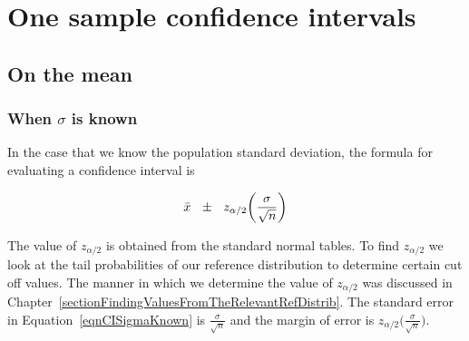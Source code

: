 \section{One sample confidence intervals}
\label{sectionOneSampleConfidenceIntervals}

\subsection{On the mean}

\subsubsection{When $\sigma$ is known}
\label{sectionCIWhenSigmaIsKnown}

In the case that we know the population standard deviation, the formula for evaluating a
confidence interval is 

\begin{termBox}{
\begin{equation}
\bar{x}	~~ \pm ~~		z_{\alpha / 2}  \bigg( \frac{\sigma}{ \sqrt{n} } \bigg)\label{eqnCISigmaKnown}\\
\end{equation}
}
\end{termBox}


The value of $z_{\alpha/2}$ is obtained from the standard normal tables.
To find $z_{\alpha/2}$ we look at the tail probabilities of our reference distribution to determine certain cut off values.
The manner in which we determine the value of $z_{\alpha / 2}$ was
discussed in Chapter~\ref{sectionFindingValuesFromTheRelevantRefDistrib}.
The standard error in Equation~\ref{eqnCISigmaKnown} is $\frac{\sigma}{\sqrt{n}}$
and the margin of error is $z_{\alpha/2} \big( \frac{\sigma}{\sqrt{n}} \big)$.



